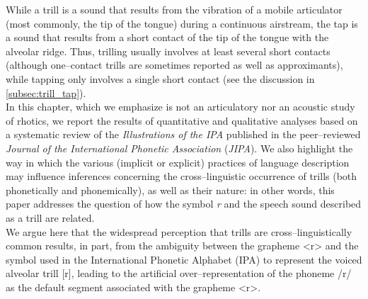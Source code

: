 While a trill is a sound that results from the vibration of a mobile articulator (most commonly, the tip of the tongue) during a continuous airstream, the tap is a sound that results from a short contact of the tip of the tongue with the alveolar ridge. Thus, trilling usually involves at least several short contacts (although one–contact trills are sometimes reported as well as approximants), while tapping only involves a single short contact (see the discussion in \autoref{subsec:trill_tap}).\\

In this chapter, which we emphasize is not an articulatory nor an acoustic study of rhotics, we report the results of quantitative and qualitative analyses based on a systematic review of the \textit{Illustrations of the IPA} published in the peer–reviewed \textit{Journal of the International Phonetic Association} (\textit{JIPA}). We also highlight the way in which the various (implicit or explicit) practices of language description may influence inferences concerning the cross–linguistic occurrence of trills (both phonetically and phonemically), as well as their nature: in other words, this paper addresses the question of how the symbol \textit{r} and the speech sound described as a trill are related. \\

We argue here that the widespread perception that trills are cross–linguistically common results, in part, from the ambiguity between the grapheme <r> and the symbol used in the International Phonetic Alphabet (IPA) to represent the voiced alveolar trill [r], leading to the artificial over–representation of the phoneme /r/ as the default segment associated with the grapheme <r>.\\

